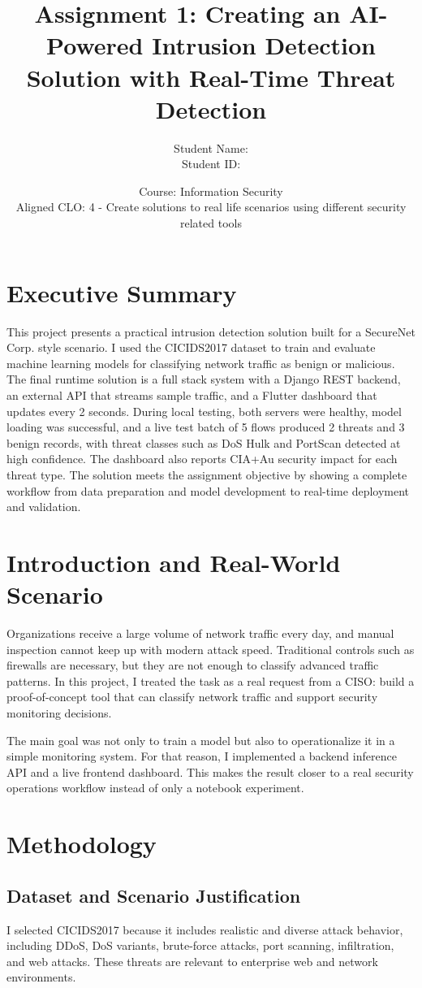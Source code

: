 \documentclass[12pt,a4paper]{article}
\title{Assignment 1: Creating an AI-Powered Intrusion Detection Solution with Real-Time Threat Detection}
\author{Student Name: \underline{\hspace{6cm}}\\
Student ID: \underline{\hspace{6cm}}}
\date{Course: Information Security\\
Aligned CLO: 4 - Create solutions to real life scenarios using different security related tools}
\begin{document}
\maketitle
\thispagestyle{empty}
\newpage

\section*{Executive Summary}
This project presents a practical intrusion detection solution built for a SecureNet Corp. style scenario. I used the CICIDS2017 dataset to train and evaluate machine learning models for classifying network traffic as benign or malicious. The final runtime solution is a full stack system with a Django REST backend, an external API that streams sample traffic, and a Flutter dashboard that updates every 2 seconds. During local testing, both servers were healthy, model loading was successful, and a live test batch of 5 flows produced 2 threats and 3 benign records, with threat classes such as DoS Hulk and PortScan detected at high confidence. The dashboard also reports CIA+Au security impact for each threat type. The solution meets the assignment objective by showing a complete workflow from data preparation and model development to real-time deployment and validation.

\section{Introduction and Real-World Scenario}
Organizations receive a large volume of network traffic every day, and manual inspection cannot keep up with modern attack speed. Traditional controls such as firewalls are necessary, but they are not enough to classify advanced traffic patterns. In this project, I treated the task as a real request from a CISO: build a proof-of-concept tool that can classify network traffic and support security monitoring decisions.

The main goal was not only to train a model but also to operationalize it in a simple monitoring system. For that reason, I implemented a backend inference API and a live frontend dashboard. This makes the result closer to a real security operations workflow instead of only a notebook experiment.

\section{Methodology}
\subsection{Dataset and Scenario Justification}
I selected CICIDS2017 because it includes realistic and diverse attack behavior, including DDoS, DoS variants, brute-force attacks, port scanning, infiltration, and web attacks. These threats are relevant to enterprise web and network environments.
\end{document}
